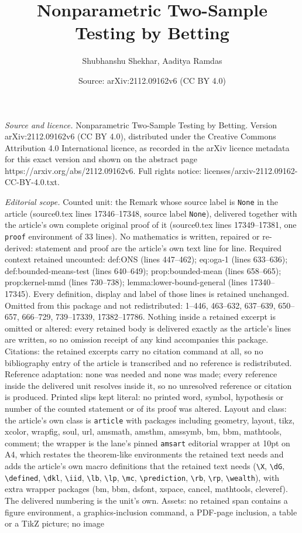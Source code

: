 \documentclass[10pt,a4paper]{amsart}
\title[Nonparametric Two-Sample Testing by Betting]{Nonparametric Two-Sample Testing by Betting}
\author{Shubhanshu Shekhar, Aaditya Ramdas}
\date{Source: arXiv:2112.09162v6 (CC BY 4.0)}
\begin{document}
\maketitle

\noindent\emph{Source and licence.} Nonparametric Two-Sample Testing by Betting. Version arXiv:2112.09162v6 (CC BY 4.0), distributed under the Creative Commons Attribution 4.0 International licence, as recorded in the arXiv licence metadata for this exact version and shown on the abstract page https://arxiv.org/abs/2112.09162v6. Full rights notice: licenses/arxiv-2112.09162-CC-BY-4.0.txt.\par\smallskip

\noindent\textit{Editorial scope.} Counted unit: the Remark whose source label is \texttt{None} in the article (source0.tex lines 17346--17348, source label \texttt{None}), delivered together with the article's own complete original proof of it (source0.tex lines 17349--17381, one \texttt{proof} environment of 33 lines). No mathematics is written, repaired or re-derived: statement and proof are the article's own text line for line. Required context retained uncounted: def:ONS (lines 447--462); eq:oga-1 (lines 633--636); def:bounded-means-test (lines 640--649); prop:bounded-mean (lines 658--665); prop:kernel-mmd (lines 730--738); lemma:lower-bound-general (lines 17340--17345). Every definition, display and label of those lines is retained unchanged. Omitted from this package and not redistributed: 1--446, 463--632, 637--639, 650--657, 666--729, 739--17339, 17382--17786. Nothing inside a retained excerpt is omitted or altered: every retained body is delivered exactly as the article's lines are written, so no omission receipt of any kind accompanies this package. Citations: the retained excerpts carry no citation command at all, so no bibliography entry of the article is transcribed and no reference is redistributed. Reference adaptation: none was needed and none was made; every reference inside the delivered unit resolves inside it, so no unresolved reference or citation is produced. Printed slips kept literal: no printed word, symbol, hypothesis or number of the counted statement or of its proof was altered. Layout and class: the article's own class is \texttt{article} with packages including geometry, layout, tikz, xcolor, wrapfig, soul, url, amsmath, amsthm, amssymb, bm, bbm, mathtools, comment; the wrapper is the lane's pinned \texttt{amsart} editorial wrapper at 10pt on A4, which restates the theorem-like environments the retained text needs and adds the article's own macro definitions that the retained text needs (\texttt{\textbackslash X}, \texttt{\textbackslash dG}, \texttt{\textbackslash defined}, \texttt{\textbackslash dkl}, \texttt{\textbackslash iid}, \texttt{\textbackslash lb}, \texttt{\textbackslash lp}, \texttt{\textbackslash mc}, \texttt{\textbackslash prediction}, \texttt{\textbackslash rb}, \texttt{\textbackslash rp}, \texttt{\textbackslash wealth}), with extra wrapper packages (bm, bbm, dsfont, xspace, cancel, mathtools, cleveref). The delivered numbering is the unit's own. Assets: no retained span contains a figure environment, a graphics-inclusion command, a PDF-page inclusion, a table or a TikZ picture; no image 
\end{document}
